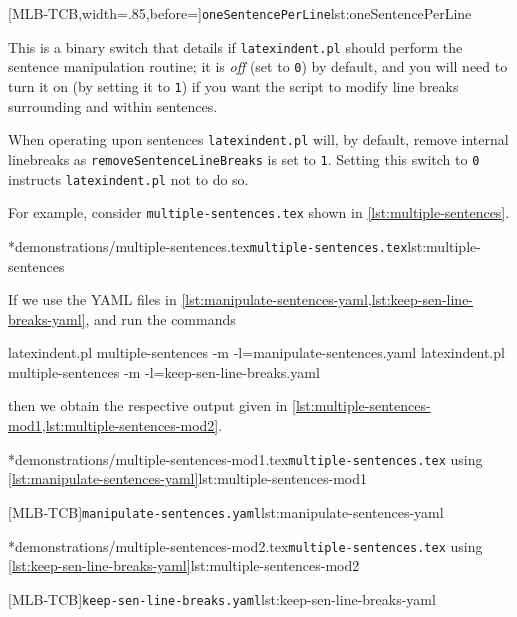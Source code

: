 	[MLB-TCB,width=.85\linewidth,before=\centering]{\texttt{oneSentencePerLine}}{lst:oneSentencePerLine}

	This is a binary switch that details if \texttt{latexindent.pl} should perform the sentence manipulation routine; it is \emph{off} (set to \texttt{0}) by default, and you will need to turn it on (by setting it to \texttt{1}) if you want the script to modify line breaks surrounding and within sentences.

	When operating upon sentences \texttt{latexindent.pl} will, by default, remove internal linebreaks as \texttt{removeSentenceLineBreaks} is set to \texttt{1}.
	Setting this switch to \texttt{0} instructs \texttt{latexindent.pl} not to do so.

	For example, consider \texttt{multiple-sentences.tex} shown in \cref{lst:multiple-sentences}.

	\cmhlistingsfromfile*[showspaces=false]*{demonstrations/multiple-sentences.tex}{\texttt{multiple-sentences.tex}}{lst:multiple-sentences}

	If we use the YAML files in \cref{lst:manipulate-sentences-yaml,lst:keep-sen-line-breaks-yaml}, and run the commands \begin{widepage} \begin{commandshell}
latexindent.pl multiple-sentences -m -l=manipulate-sentences.yaml
latexindent.pl multiple-sentences -m -l=keep-sen-line-breaks.yaml
	\end{commandshell} \end{widepage} then we obtain the respective output given in \cref{lst:multiple-sentences-mod1,lst:multiple-sentences-mod2}.

	\begin{minipage}{.5\linewidth}
		\cmhlistingsfromfile*[showspaces=false]*{demonstrations/multiple-sentences-mod1.tex}{\texttt{multiple-sentences.tex} using \cref{lst:manipulate-sentences-yaml}}{lst:multiple-sentences-mod1}
	\end{minipage}
	\hfill
	\begin{minipage}{.5\linewidth}
		[MLB-TCB]{\texttt{manipulate-sentences.yaml}}{lst:manipulate-sentences-yaml}
	\end{minipage}

	\begin{minipage}{.5\linewidth}
		\cmhlistingsfromfile*[showspaces=false]*{demonstrations/multiple-sentences-mod2.tex}{\texttt{multiple-sentences.tex} using \cref{lst:keep-sen-line-breaks-yaml}}{lst:multiple-sentences-mod2}
	\end{minipage}
	\hfill
	\begin{minipage}{.5\linewidth}
		[MLB-TCB]{\texttt{keep-sen-line-breaks.yaml}}{lst:keep-sen-line-breaks-yaml}
	\end{minipage}

